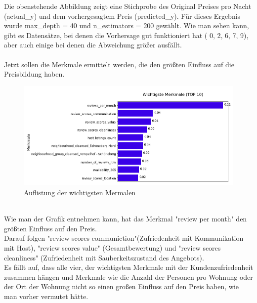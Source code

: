 \documentclass[12pt]{article}
\begin{document}
\begin{text}
Die obenstehende Abbildung zeigt eine Stichprobe des Original Preises pro Nacht (actual\_y) und dem vorhergesagtem Preis (predicted\_y). Für dieses Ergebnis wurde max\_depth = 40 und n\_estimators = 200 gewählt. Wie man sehen kann, gibt es Datensätze, bei denen die Vorhersage gut funktioniert hat ( 0, 2, 6, 7, 9), aber auch einige bei denen die Abweichung größer ausfällt.
\\\\
Jetzt sollen die Merkmale ermittelt werden, die den größten Einfluss auf die Preisbildung haben.
\\
\begin{figure}[h]
 \includegraphics[width=1\textwidth]{wichtigeMermale.png}
 \caption{Auflistung der wichtigsten Mermalen}
\end{figure}
\\
Wie man der Grafik entnehmen kann, hat das Merkmal "review per month" den größten Einfluss auf den Preis. 
\\[0.3 cm]
Darauf folgen "review scores communiction"(Zufriedenheit mit Kommunikation mit Host), "review scores value" (Gesamtbewertung) und "review scores cleanliness" (Zufriedenheit mit Sauberkeitszustand des Angebots).
\\[0.3 cm]
Es fällt auf, dass alle vier, der wichtigsten Merkmale mit der Kundenzufriedenheit zusammen hängen und Merkmale wie die Anzahl der Personen pro Wohnung oder der Ort der Wohnung nicht so einen großen Einfluss auf den Preis haben, wie man vorher vermutet hätte. 
\\[0.3 cm]



\end{text}
\end{document}
